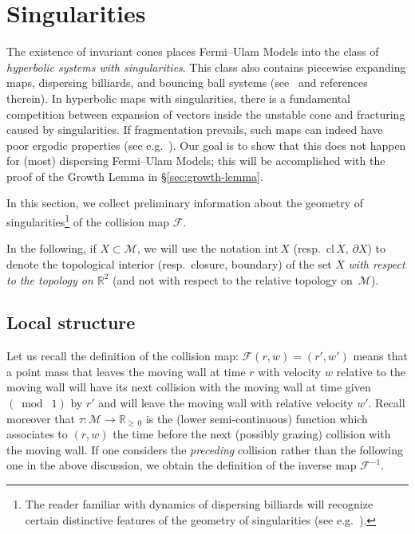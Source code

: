 \documentclass[AHL, Unicode, longabstracts,published]{cedram}
\newcommand{\ct}{r}
\newcommand{\fft}{\tau}
\newcommand{\intr}[1]{\mathrm{int}\,#1}
\newcommand{\inv}{^{-1}}
\newcommand{\reals}{\mathbb{R}}
\newcommand{\cm}{\mathcal{F}}
\newcommand{\csp}{\mathcal{M}}
\newcommand{\clo}{\text{cl}\,}
\begin{document}
\section{Singularities}\label{s_singularities}

The existence of invariant cones places Fermi--Ulam Models into the class of \emph{hyperbolic systems with singularities}. This class also contains piecewise expanding maps, dispersing billiards, and bouncing ball systems (see~\cite{ChM, LW, T2, W-particles} and references therein). In hyperbolic maps with singularities, there is a fundamental competition between expansion of vectors inside the unstable cone and fracturing caused by singularities. If fragmentation prevails, such maps can indeed have poor ergodic properties (see e.g.~\cite{T1}). Our goal is to show that this does not happen for (most) dispersing Fermi--Ulam Models; this will be accomplished with the proof of the Growth Lemma in \S\ref{sec:growth-lemma}.

In this section, we collect preliminary information about the geometry of singularities\footnote{The reader familiar with dynamics of dispersing billiards will recognize certain distinctive features of the geometry of singularities (see e.g.~\cite[\S2.10]{ChM}).} of the collision map $\cm$.

\begin{rema}
In the following, if $X\subset\csp$, we will use the notation $\intr X$ ({resp.\ $\clo X$, $\partial X$}) to denote the topological interior (resp.\ closure, boundary) of the set $X$
\emph{with respect to the topology on $\reals^2$} (and not with respect to the relative topology on~$\csp$).
\end{rema}

\subsection{Local structure}\label{ss_singularitiesLocalStructure}

Let us recall the definition of the collision map: $\cm(\ct,w) = (\ct',w')$ means that a point mass that leaves the moving wall at time $\ct$ with velocity $w$ relative to the moving wall will have its next collision with the moving wall at time given $(\bmod \; 1)$ by $\ct'$ and will leave the moving wall with relative velocity $w'$. Recall moreover that $\fft:\csp\to\reals_{\ge\,0}$ is the (lower semi-continuous) function which associates to $(\ct,w)$ the time before the next (possibly grazing) collision with the moving wall. If one considers the
\emph{preceding} collision rather than the following one in the above discussion, we obtain the definition of the inverse map $\cm\inv$.
\end{document}
